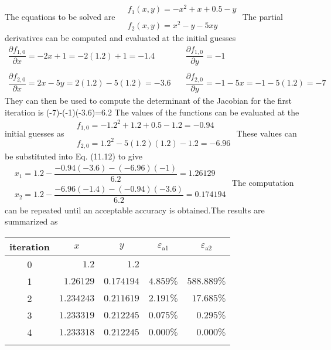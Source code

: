 \documentclass[../main.tex]{subfiles}
\begin{document}
\begin{enumerate}[label=\bfseries(\alph*)]
The equations to be solved are
\bigbreak$
\begin{aligned}
&f_{1}(x, y)=-x^{2}+x+0.5-y \\\\
&f_{2}(x, y)=x^{2}-y-5 x y
\end{aligned}$
\bigbreak
The partial derivatives can be computed and evaluated at the initial guesses
\bigbreak$
\begin{array}{ll}
\dfrac{\partial f_{1,0}}{\partial x}=-2 x+1=-2(1.2)+1=-1.4 & \quad\dfrac{\partial f_{1,0}}{\partial y}=-1 \\\\
\dfrac{\partial f_{2,0}}{\partial x}=2 x-5 y=2(1.2)-5(1.2)=-3.6 & \quad\dfrac{\partial f_{2,0}}{\partial y}=-1-5 x=-1-5(1.2)=-7
\end{array}$
\bigbreak
They can then be used to compute the determinant of the Jacobian for the first iteration is
(-7)-(-1)(-3.6)=6.2
\bigbreak
The values of the functions can be evaluated at the initial guesses as
\bigbreak$
\begin{aligned}
&f_{1,0}=-1.2^{2}+1.2+0.5-1.2=-0.94 \\\\
&f_{2,0}=1.2^{2}-5(1.2)(1.2)-1.2=-6.96
\end{aligned}$
\bigbreak
These values can be substituted into Eq. (11.12) to give
\bigbreak$
\begin{aligned}
&x_{1}=1.2-\dfrac{-0.94(-3.6)-(-6.96)(-1)}{6.2}=1.26129 \\
&x_{2}=1.2-\dfrac{-6.96(-1.4)-(-0.94)(-3.6)}{6.2}=0.174194
\end{aligned}$
\bigbreak
The computation can be repeated until an acceptable accuracy is obtained.\smallbreak The results are summarized as
\bigbreak
\begin{tabular}{crrrr}
\Xhline{1.5pt}
iteration & \multicolumn{1}{c}{$x$} & \multicolumn{1}{c}{$y$} & \multicolumn{1}{c}{$\varepsilon_{\mathrm{a} 1}$} & \multicolumn{1}{c}{$\varepsilon_{\mathrm{a} 2}$} \\
\hline
0 & $1.2$ & $1.2$ &  &  \\
1 & $1.26129$ & $0.174194$ & $4.859 \%$ & $588.889 \%$ \\
2 & $1.234243$ & $0.211619$ & $2.191 \%$ & $17.685 \%$ \\
3 & $1.233319$ & $0.212245$ & $0.075 \%$ & $0.295 \%$ \\
4 & $1.233318$ & $0.212245$ & $0.000 \%$ & $0.000 \%$ \\
\Xhline{1.5pt}
\end{tabular}
\bigbreak
\end{enumerate}
\end{document}
